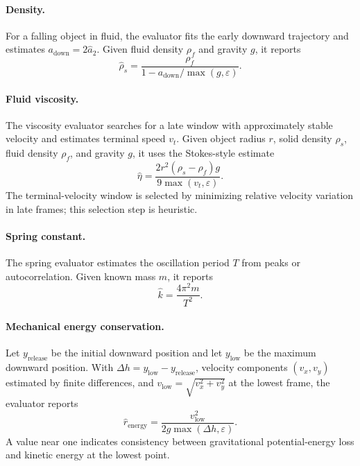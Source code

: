 \documentclass{article}
\newcommand{\eps}{\varepsilon}
\begin{document}
\paragraph{Density.}
For a falling object in fluid, the evaluator fits the early downward trajectory and estimates $a_{\mathrm{down}}=2\hat{a}_2$.
Given fluid density $\rho_f$ and gravity $g$, it reports
\begin{equation}
    \hat{\rho}_s = \frac{\rho_f}{1-a_{\mathrm{down}}/\max(g,\eps)}.
\end{equation}

\paragraph{Fluid viscosity.}
The viscosity evaluator searches for a late window with approximately stable velocity and estimates terminal speed $v_t$.
Given object radius $r$, solid density $\rho_s$, fluid density $\rho_f$, and gravity $g$, it uses the Stokes-style estimate
\begin{equation}
    \hat{\eta} =
    \frac{2r^2(\rho_s-\rho_f)g}{9\max(v_t,\eps)}.
\end{equation}
The terminal-velocity window is selected by minimizing relative velocity variation in late frames; this selection step is heuristic.

\paragraph{Spring constant.}
The spring evaluator estimates the oscillation period $T$ from peaks or autocorrelation.
Given known mass $m$, it reports
\begin{equation}
    \hat{k} = \frac{4\pi^2m}{T^2}.
\end{equation}

\paragraph{Mechanical energy conservation.}
Let $y_{\mathrm{release}}$ be the initial downward position and let $y_{\mathrm{low}}$ be the maximum downward position.
With $\Delta h=y_{\mathrm{low}}-y_{\mathrm{release}}$, velocity components $(v_x,v_y)$ estimated by finite differences, and $v_{\mathrm{low}}=\sqrt{v_x^2+v_y^2}$ at the lowest frame, the evaluator reports
\begin{equation}
    \hat{r}_{\mathrm{energy}} =
    \frac{v_{\mathrm{low}}^2}{2g\max(\Delta h,\eps)}.
\end{equation}
A value near one indicates consistency between gravitational potential-energy loss and kinetic energy at the lowest point.
\end{document}

